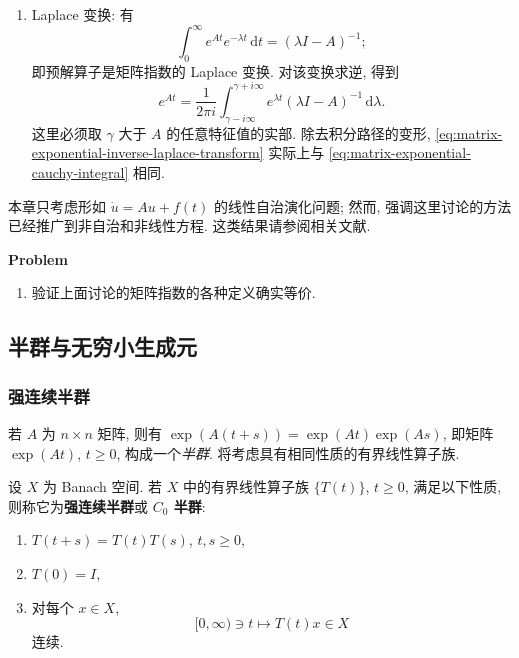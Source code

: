 \begin{enumerate}
\item Laplace 变换: 有
\begin{equation}\label{eq:matrix-exponential-laplace-transform-resolvent}
\int_0^\infty e^{At}e^{-\lambda t}\,\mathrm{d}t=(\lambda I-A)^{-1};
\end{equation}
即预解算子是矩阵指数的 Laplace 变换. 对该变换求逆, 得到
\begin{equation}\label{eq:matrix-exponential-inverse-laplace-transform}
e^{At}=\dfrac{1}{2\pi i}\int_{\gamma-i\infty}^{\gamma+i\infty}e^{\lambda t}(\lambda I-A)^{-1}\,\mathrm{d}\lambda.
\end{equation}
这里必须取 $\gamma$ 大于 $A$ 的任意特征值的实部. 除去积分路径的变形, \eqref{eq:matrix-exponential-inverse-laplace-transform} 实际上与 \eqref{eq:matrix-exponential-cauchy-integral} 相同.\end{enumerate}

本章只考虑形如 $\dot u=Au+f(t)$ 的线性自治演化问题; 然而, 强调这里讨论的方法已经推广到非自治和非线性方程. 这类结果请参阅相关文献.

\textbf{Problem}

\begin{enumerate}[label=\thesection.\arabic*.,ref=\thesection.\arabic*,start=1,series=book-problems]

\item\label{ex:matrix-exponential-definitions-equivalence} 验证上面讨论的矩阵指数的各种定义确实等价.

\end{enumerate}

\subsection{半群与无穷小生成元}\label{sec:semigroups-infinitesimal-generators}

\subsubsection{强连续半群}\label{subsec:strongly-continuous-semigroups}

若 $A$ 为 $n\times n$ 矩阵, 则有 $\exp(A(t+s))=\exp(At)\exp(As)$, 即矩阵 $\exp(At)$, $t\geq0$, 构成一个\emph{半群}. 将考虑具有相同性质的有界线性算子族.

\begin{Definition}
\label{def:strongly-continuous-semigroup}
设 $X$ 为 Banach 空间. 若 $X$ 中的有界线性算子族 $\{T(t)\}$, $t\geq0$, 满足以下性质, 则称它为\textbf{强连续半群}或 \textbf{$C_0$ 半群}:\begin{enumerate}\item\label{hyp:semigroup-composition-law} $T(t+s)=T(t)T(s)$, $t,s\geq0$,\item\label{hyp:semigroup-zero-identity} $T(0)=I$,\item\label{hyp:semigroup-orbit-continuity} 对每个 $x\in X$,\[[0,\infty)\ni t\mapsto T(t)x\in X\]连续.\end{enumerate}
\end{Definition}

